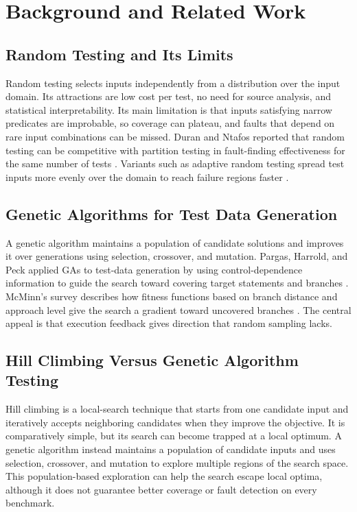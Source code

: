\documentclass[12pt,onecolumn]{IEEEtran}
\begin{document}
\section{Background and Related Work}

\subsection{Random Testing and Its Limits}

Random testing selects inputs independently from a distribution over the input domain. Its attractions are low cost per test, no need for source analysis, and statistical interpretability. Its main limitation is that inputs satisfying narrow predicates are improbable, so coverage can plateau, and faults that depend on rare input combinations can be missed. Duran and Ntafos reported that random testing can be competitive with partition testing in fault-finding effectiveness for the same number of tests \cite{duran1984}. Variants such as adaptive random testing spread test inputs more evenly over the domain to reach failure regions faster \cite{chen2004}.

\subsection{Genetic Algorithms for Test Data Generation}

A genetic algorithm maintains a population of candidate solutions and improves it over generations using selection, crossover, and mutation. Pargas, Harrold, and Peck applied GAs to test-data generation by using control-dependence information to guide the search toward covering target statements and branches \cite{pargas1999}. McMinn's survey describes how fitness functions based on branch distance and approach level give the search a gradient toward uncovered branches \cite{mcminn2004}. The central appeal is that execution feedback gives direction that random sampling lacks.

\subsection{Hill Climbing Versus Genetic Algorithm Testing}

Hill climbing is a local-search technique that starts from one candidate input and iteratively accepts neighboring candidates when they improve the objective. It is comparatively simple, but its search can become trapped at a local optimum. A genetic algorithm instead maintains a population of candidate inputs and uses selection, crossover, and mutation to explore multiple regions of the search space. This population-based exploration can help the search escape local optima, although it does not guarantee better coverage or fault detection on every benchmark.
\end{document}

